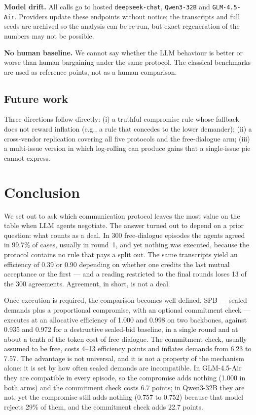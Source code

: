\documentclass[11pt]{article}
\begin{document}
\textbf{Model drift.} All calls go to hosted \texttt{deepseek-chat}, \texttt{Qwen3-32B} and \texttt{GLM-4.5-Air}. Providers update these endpoints without notice; the transcripts and full seeds are archived so the analysis can be re-run, but exact regeneration of the numbers may not be possible.

\textbf{No human baseline.} We cannot say whether the LLM behaviour is better or worse than human bargaining under the same protocol. The classical benchmarks are used as reference points, not as a human comparison.

\subsection{Future work}

Three directions follow directly: (i) a truthful compromise rule whose fallback does not reward inflation (e.g., a rule that concedes to the lower demander); (ii) a cross-vendor replication covering all five protocols and the free-dialogue arm; (iii) a multi-issue version in which log-rolling can produce gains that a single-issue pie cannot express.

\section{Conclusion}

We set out to ask which communication protocol leaves the most value on the table when LLM agents negotiate. The answer turned out to depend on a prior question: what counts as a deal. In 300 free-dialogue episodes the agents agreed in 99.7\% of cases, usually in round~1, and yet nothing was executed, because the protocol contains no rule that pays a split out. The same transcripts yield an efficiency of 0.39 or 0.90 depending on whether one credits the last mutual acceptance or the first --- and a reading restricted to the final rounds loses 13 of the 300 agreements. Agreement, in short, is not a deal.

Once execution is required, the comparison becomes well defined. SPB --- sealed demands plus a proportional compromise, with an optional commitment check --- executes at an allocative efficiency of 1.000 and 0.998 on two backbones, against 0.935 and 0.972 for a destructive sealed-bid baseline, in a single round and at about a tenth of the token cost of free dialogue. The commitment check, usually assumed to be free, costs 4--13 efficiency points and inflates demands from 6.23 to 7.57. The advantage is not universal, and it is not a property of the mechanism alone: it is set by how often sealed demands are incompatible. In GLM-4.5-Air they are compatible in every episode, so the compromise adds nothing (1.000 in both arms) and the commitment check costs 6.7 points; in Qwen3-32B they are not, yet the compromise still adds nothing (0.757 to 0.752) because that model rejects 29\% of them, and the commitment check adds 22.7 points.
\end{document}
